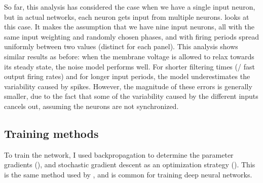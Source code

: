 So far, this analysis has considered the case
when we have a single input neuron,
but in actual networks, each neuron gets input from multiple neurons.
 looks at this case.
It makes the assumption that we have nine input neurons,
all with the same input weighting and randomly chosen phases,
and with firing periods spread uniformly between two values (distinct for each panel).
This analysis shows similar results as before:
when the membrane voltage is allowed to relax towards its steady state,
the noise model performs well.
For shorter filtering times (\ie/ fast output firing rates)
and for longer input periods,
the model underestimates the variability caused by spikes.
However, the magnitude of these errors is generally smaller,
due to the fact that some of the variability caused by the different inputs
cancels out, assuming the neurons are not synchronized.


\subsection{Training methods}

To train the network,
I used backpropagation to determine the parameter gradients (),
and stochastic gradient descent as an optimization strategy ().
This is the same method used by \textcite{Krizhevsky2012},
and is common for training deep neural networks.

